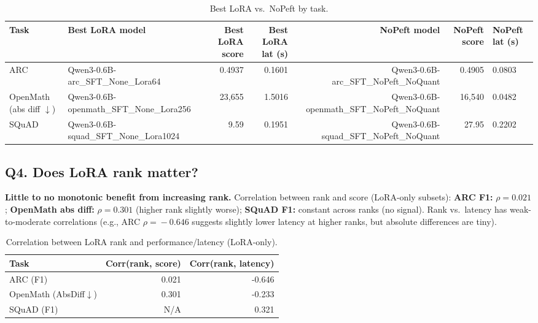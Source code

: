 \documentclass[11pt,a4paper]{article}
\begin{document}
\begin{table}[htbp]
\centering
\caption{Best LoRA vs.\ NoPeft by task.}
\label{tab:lora_vs_nopeft}
\footnotesize
\begin{adjustbox}{max width=\textwidth}
\begin{tabular}{llrrrrl}
\toprule
Task & Best LoRA model & Best LoRA score & Best LoRA lat (s) & NoPeft model & NoPeft score & NoPeft lat (s) \\
\midrule
ARC & Qwen3-0.6B-arc\_SFT\_None\_Lora64 & 0.4937 & 0.1601 & Qwen3-0.6B-arc\_SFT\_NoPeft\_NoQuant & 0.4905 & 0.0803 \\
OpenMath (abs diff $\downarrow$) & Qwen3-0.6B-openmath\_SFT\_None\_Lora256 & 23{,}655 & 1.5016 & Qwen3-0.6B-openmath\_SFT\_NoPeft\_NoQuant & 16{,}540 & 0.0482 \\
SQuAD & Qwen3-0.6B-squad\_SFT\_None\_Lora1024 & 9.59 & 0.1951 & Qwen3-0.6B-squad\_SFT\_NoPeft\_NoQuant & 27.95 & 0.2202 \\
\bottomrule
\end{tabular}
\end{adjustbox}
\end{table}

\subsection*{\textbf{Q4. Does LoRA rank matter?}}
\textbf{Little to no monotonic benefit from increasing rank.} 
Correlation between rank and score (LoRA-only subsets): \textbf{ARC F1:} $\rho\!=\!0.021$; \textbf{OpenMath abs diff:} $\rho\!=\!0.301$ (higher rank slightly worse); \textbf{SQuAD F1:} constant across ranks (no signal). Rank vs.\ latency has weak-to-moderate correlations (e.g., ARC $\rho\!=\!-0.646$ suggests slightly lower latency at higher ranks, but absolute differences are tiny).
\begin{table}[h!]
\centering
\caption{Correlation between LoRA rank and performance/latency (LoRA-only).}
\label{tab:correlations}
{\small
\begin{tabular}{lrr}
\toprule
Task & Corr(rank, score) & Corr(rank, latency) \\
\midrule
ARC (F1) & 0.021 & -0.646 \\
OpenMath (AbsDiff$\downarrow$) & 0.301 & -0.233 \\
SQuAD (F1) & N/A & 0.321 \\
\bottomrule
\end{tabular}
}
\end{table}
\end{document}
